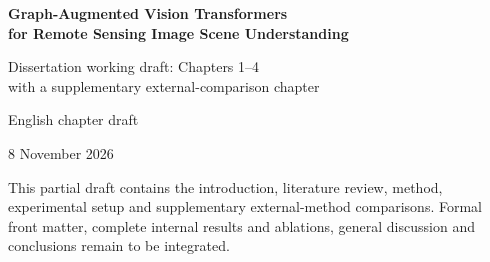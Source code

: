 \documentclass[12pt,a4paper]{report}
\numberwithin{equation}{chapter}                          %
\renewcommand{\contentsname}{}
\renewcommand{\cftsecpagefont}{\color{white}}        %
\begin{document}
\onehalfspacing
\setlength{\parindent}{0pt}
\setlength{\parskip}{0.3em}
\setlength{\emergencystretch}{2em}
\renewcommand{\cftsecpagefont}{\normalfont}
\renewcommand{\contentsname}{Contents}
\begin{titlepage}
\centering
\vspace*{2cm}
{\Large\bfseries Graph-Augmented Vision Transformers\\[0.4em]
for Remote Sensing Image Scene Understanding\par}
\vspace{2cm}
{\large Dissertation working draft: Chapters 1--4\\
with a supplementary external-comparison chapter\par}
\vspace{0.5cm}
{\large English chapter draft\par}
\vfill
8 November 2026\par
\vspace{0.7cm}
{\small This partial draft contains the introduction, literature review,
method, experimental setup and supplementary external-method comparisons.
Formal front matter, complete internal results and ablations, general
discussion and conclusions remain to be integrated.}
\end{titlepage}
\tableofcontents
\clearpage
{}
\setcounter{chapter}{0}





\clearpage
\renewcommand{\bibname}{References}


\end{document}
